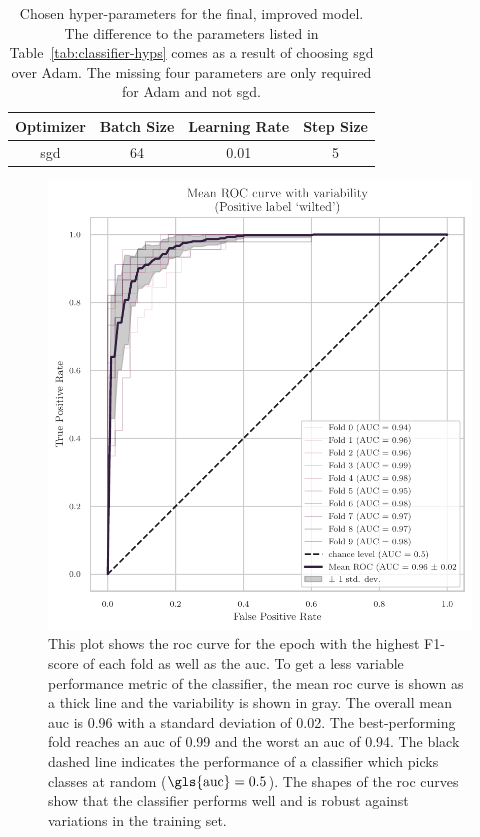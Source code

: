 \documentclass[draft,final]{vutinfth} %
\begin{document}
\begin{table}
  \centering
  \begin{tabular}{cccc}
    \toprule
    Optimizer &  Batch Size & Learning Rate & Step Size \\
    \midrule
    \gls{sgd} & 64 & 0.01 & 5\\
    \bottomrule
  \end{tabular}
  \caption[Hyper-parameters for the optimized classifier.]{Chosen
    hyper-parameters for the final, improved model. The difference to
    the parameters listed in Table~\ref{tab:classifier-hyps} comes as
    a result of choosing \gls{sgd} over Adam. The missing four
    parameters are only required for Adam and not \gls{sgd}.}
  \label{tab:classifier-final-hyps}
\end{table}

\begin{figure}
  \centering
  \includegraphics{graphics/classifier-hyp-folds-roc.pdf}
  \caption[Mean \gls{roc} and variability of hyper-parameter-optimized
  model.]{This plot shows the \gls{roc} curve for the epoch with the
    highest F1-score of each fold as well as the \gls{auc}. To get a
    less variable performance metric of the classifier, the mean
    \gls{roc} curve is shown as a thick line and the variability is
    shown in gray. The overall mean \gls{auc} is 0.96 with a standard
    deviation of 0.02. The best-performing fold reaches an \gls{auc}
    of 0.99 and the worst an \gls{auc} of 0.94. The black dashed line
    indicates the performance of a classifier which picks classes at
    random ($\mathrm{\gls{auc}} = 0.5$). The shapes of the \gls{roc}
    curves show that the classifier performs well and is robust
    against variations in the training set.}
  \label{fig:classifier-hyp-roc}
\end{figure}
\end{document}
